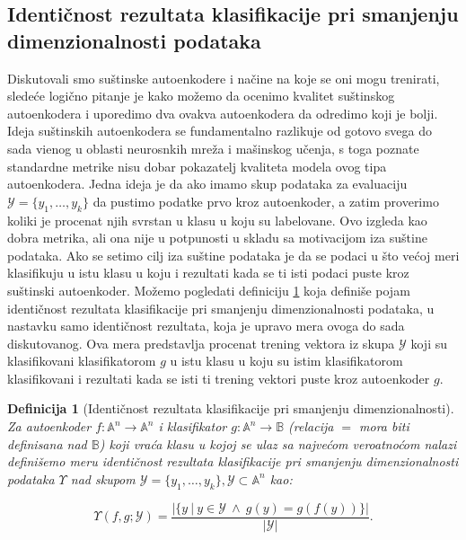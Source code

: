 \documentclass{article}
\newtheorem{definition}{Definicija}
\begin{document}
	\subsection{Identi\v cnost rezultata klasifikacije pri smanjenju dimenzionalnosti podataka}
	
	Diskutovali smo su\v stinske autoenkodere i na\v cine na koje se oni mogu trenirati, slede\'ce logi\v cno pitanje je kako mo\v zemo da ocenimo kvalitet su\v stinskog autoenkodera i uporedimo dva ovakva autoenkodera da odredimo koji je bolji.
	Ideja su\v stinskih autoenkodera se fundamentalno razlikuje od gotovo svega do sada vi\dj enog u oblasti neurosnkih mre\v za i ma\v sinskog u\v cenja, s toga poznate standardne metrike nisu dobar pokazatelj kvaliteta modela ovog tipa autoenkodera.
	Jedna ideja je da ako imamo skup podataka za evaluaciju $\mathcal{Y} = \{y_1, \dots, y_k\}$ da pustimo podatke prvo kroz autoenkoder, a zatim proverimo koliki je procenat njih svrstan u klasu u koju su labelovane.
	Ovo izgleda kao dobra metrika, ali ona nije u potpunosti u skladu sa motivacijom iza su\v stine podataka.
	Ako se setimo cilj iza su\v stine podataka je da se podaci u \v sto ve\'coj meri klasifikuju u istu klasu u koju i rezultati kada se ti isti podaci puste kroz su\v stinski autoenkoder.
	Mo\v zemo pogledati definiciju \ref{identicality-of-results-of-classification-upon-dimensionality-reduction} koja defini\v se pojam identi\v cnost rezultata klasifikacije pri smanjenju dimenzionalnosti podataka, u nastavku samo identi\v cnost rezultata, koja je upravo mera ovoga do sada diskutovanog. 
	Ova mera predstavlja procenat trening vektora iz skupa $\mathcal{Y}$ koji su klasifikovani klasifikatorom $g$ u istu klasu u koju su istim klasifikatorom klasifikovani i rezultati kada se isti ti trening vektori puste kroz autoenkoder $g$.
	
	\begin{definition}[Identi\v cnost rezultata klasifikacije pri smanjenju dimenzionalnosti]
		\label{identicality-of-results-of-classification-upon-dimensionality-reduction}
		\sloppy Za autoenkoder $f : \mathbb{A}^n \to \mathbb{A}^n$ i klasifikator $g : \mathbb{A}^n \to \mathbb{B}$ (relacija $=$ mora biti definisana nad $\mathbb{B}$) koji vra\'ca klasu u kojoj se ulaz sa najve\'com veroatno\'com nalazi defini\v semo meru \emph{identi\v cnost rezultata klasifikacije pri smanjenju dimenzionalnosti podataka $\Upsilon$ nad skupom $\mathcal{Y} = \{y_1, \dots, y_k\}, \mathcal {Y} \subset \mathbb{A}^n$} kao:
		
		$$
		\Upsilon (f, g; \mathcal{Y}) = \frac{\left| \{y ~|~ y \in \mathcal{Y}~ \wedge~ g(y) = g(f(y))\}\right|}{\left| \mathcal{Y} \right|}.
		$$
	\end{definition}
\end{document}
